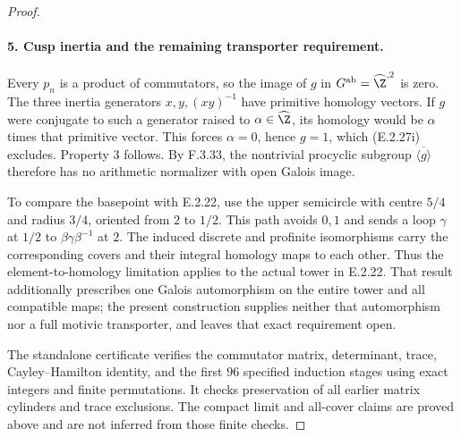 \begin{proof}
\paragraph{5. Cusp inertia and the remaining transporter requirement.}
Every \(p_n\) is a product of commutators, so the image of
\(g\) in \(G^{\mathrm{ab}}=\widehat\Z^{,2}\) is zero.
The three inertia generators \(x,y,(xy)^{-1}\) have primitive
homology vectors. If \(g\) were conjugate to such a generator
raised to \(\alpha\in\widehat\Z\), its homology would be
\(\alpha\) times that primitive vector. This forces
\(\alpha=0\), hence \(g=1\), which (E.2.27i) excludes.
Property 3 follows. By F.3.33, the nontrivial procyclic subgroup
\(\overline{\langle g\rangle}\) therefore has no arithmetic
normalizer with open Galois image.

To compare the basepoint with E.2.22, use the upper semicircle
with centre \(5/4\) and radius \(3/4\), oriented from \(2\) to
\(1/2\). This path avoids \(0,1\) and sends a loop \(\gamma\)
at \(1/2\) to \(\beta\gamma\beta^{-1}\) at \(2\).
The induced discrete and profinite isomorphisms carry the
corresponding covers and their integral homology maps to each
other. Thus the element-to-homology limitation applies to the
actual tower in E.2.22. That result additionally prescribes one
Galois automorphism on the entire tower and all compatible maps;
the present construction supplies neither that automorphism nor
a full motivic transporter, and leaves that exact requirement open.

The standalone certificate
 verifies the
commutator matrix, determinant, trace, Cayley--Hamilton identity,
and the first \(96\) specified induction stages using exact
integers and finite permutations. It checks preservation of all
earlier matrix cylinders and trace exclusions. The compact limit
and all-cover claims are proved above and are not inferred from
those finite checks.
\end{proof}


